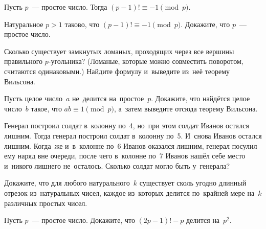 Пусть $p$~--- простое число.
Тогда $(p - 1)! \equiv -1 \pmod{p}$.

Натуральное $p > 1$ таково, что $(p - 1)! \equiv -1 \pmod{p}$.
Докажите, что $p$~--- простое число.

\begin{problems}

\item
Сколько существует замкнутых ломаных, проходящих через все вершины правильного
$p$-угольника?
(Ломаные, которые можно совместить поворотом, считаются одинаковыми.)
Найдите формулу и~выведите из~неё теорему Вильсона.

\item
Пусть целое число~$a$ не~делится на~простое~$p$.
Докажите, что найдётся целое число~$b$ такое, что $a b \equiv 1 \pmod{p}$,
а~затем выведите отсюда теорему Вильсона.

\item
Генерал построил солдат в~колонну по~4, но~при этом солдат Иванов остался
лишним.
Тогда генерал построил солдат в~колонну по~5.
И~снова Иванов остался лишним.
Когда~же и~в~колонне по~6 Иванов оказался лишним, генерал посулил ему наряд вне
очереди, после чего в~колонне по~7 Иванов нашёл себе место и~никого лишнего
не~осталось.
Сколько солдат могло быть у~генерала?

\item
Докажите, что для любого натурального~$k$ существует сколь угодно длинный
отрезок из~натуральных чисел, каждое из~которых делится по~крайней мере на~$k$
различных простых чисел.

\item
Пусть $p$~--- простое число.
Докажите, что $(2 p - 1)! - p$ делится на~$p^2$.

\end{problems}

